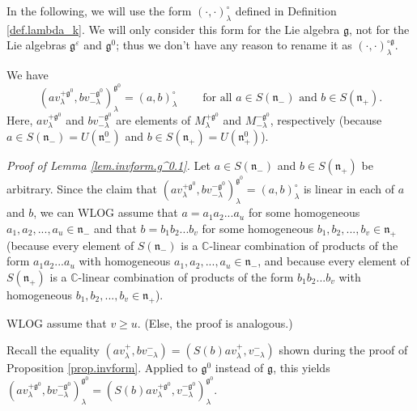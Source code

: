 \documentclass[etingof-lie.tex]{subfiles}
\begin{document}
In the following, we will use the form $\left(  \cdot,\cdot\right)  _{\lambda
}^{\circ}$ defined in Definition \ref{def.lambda_k}. We will only consider
this form for the Lie algebra $\mathfrak{g}$, not for the Lie algebras
$\mathfrak{g}^{\varepsilon}$ and $\mathfrak{g}^{0}$; thus we don't have any
reason to rename it as $\left(  \cdot,\cdot\right)  _{\lambda}^{\circ
\mathfrak{g}}$.

\begin{lemma}
\label{lem.invform.g^0.1}We have%
\begin{equation}
\left(  av_{\lambda}^{+\mathfrak{g}^{0}},bv_{-\lambda}^{-\mathfrak{g}^{0}%
}\right)  _{\lambda}^{\mathfrak{g}^{0}}=\left(  a,b\right)  _{\lambda}^{\circ
}\ \ \ \ \ \ \ \ \ \ \text{for all }a\in S\left(  \mathfrak{n}_{-}\right)
\text{ and }b\in S\left(  \mathfrak{n}_{+}\right)  . \label{prop.det.US.pf.1}%
\end{equation}
Here, $av_{\lambda}^{+\mathfrak{g}^{0}}$ and $bv_{-\lambda}^{-\mathfrak{g}%
^{0}}$ are elements of $M_{\lambda}^{+\mathfrak{g}^{0}}$ and $M_{-\lambda
}^{-\mathfrak{g}^{0}}$, respectively (because $a\in S\left(  \mathfrak{n}%
_{-}\right)  =U\left(  \mathfrak{n}_{-}^{0}\right)  $ and $b\in S\left(
\mathfrak{n}_{+}\right)  =U\left(  \mathfrak{n}_{+}^{0}\right)  $).
\end{lemma}

\textit{Proof of Lemma \ref{lem.invform.g^0.1}.} Let $a\in S\left(
\mathfrak{n}_{-}\right)  $ and $b\in S\left(  \mathfrak{n}_{+}\right)  $ be
arbitrary. Since the claim that $\left(  av_{\lambda}^{+\mathfrak{g}^{0}%
},bv_{-\lambda}^{-\mathfrak{g}^{0}}\right)  _{\lambda}^{\mathfrak{g}^{0}%
}=\left(  a,b\right)  _{\lambda}^{\circ}$ is linear in each of $a$ and $b$, we
can WLOG assume that $a=a_{1}a_{2}...a_{u}$ for some homogeneous $a_{1}%
,a_{2},...,a_{u}\in\mathfrak{n}_{-}$ and that $b=b_{1}b_{2}...b_{v}$ for some
homogeneous $b_{1},b_{2},...,b_{v}\in\mathfrak{n}_{+}$ (because every element
of $S\left(  \mathfrak{n}_{-}\right)  $ is a $\mathbb{C}$-linear combination
of products of the form $a_{1}a_{2}...a_{u}$ with homogeneous $a_{1}%
,a_{2},...,a_{u}\in\mathfrak{n}_{-}$, and because every element of $S\left(
\mathfrak{n}_{+}\right)  $ is a $\mathbb{C}$-linear combination of products of
the form $b_{1}b_{2}...b_{v}$ with homogeneous $b_{1},b_{2},...,b_{v}%
\in\mathfrak{n}_{+}$).

WLOG assume that $v\geq u$. (Else, the proof is analogous.)

Recall the equality $\left(  av_{\lambda}^{+},bv_{-\lambda}^{-}\right)
=\left(  S\left(  b\right)  av_{\lambda}^{+},v_{-\lambda}^{-}\right)  $ shown
during the proof of Proposition \ref{prop.invform}. Applied to $\mathfrak{g}%
^{0}$ instead of $\mathfrak{g}$, this yields $\left(  av_{\lambda
}^{+\mathfrak{g}^{0}},bv_{-\lambda}^{-\mathfrak{g}^{0}}\right)  _{\lambda
}^{\mathfrak{g}^{0}}=\left(  S\left(  b\right)  av_{\lambda}^{+\mathfrak{g}%
^{0}},v_{-\lambda}^{-\mathfrak{g}^{0}}\right)  _{\lambda}^{\mathfrak{g}^{0}}$.
\end{document}
